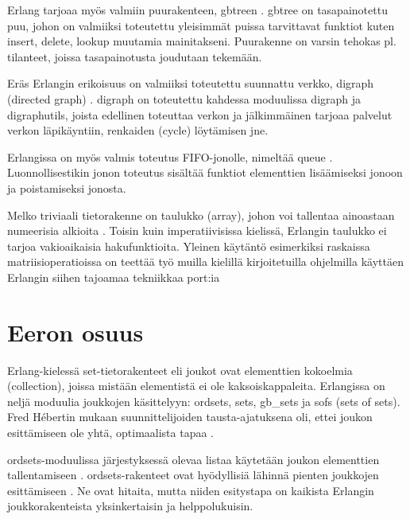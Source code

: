 \documentclass[11pt,oneside,a4paper]{article}
\begin{document}
 Erlang tarjoaa myös valmiin puurakenteen, gb\textunderscore treen \cite{HEB13}.
gb\textunderscore tree on tasapainotettu puu, johon on valmiiksi toteutettu
yleisimmät puissa tarvittavat funktiot kuten insert, delete, lookup muutamia
mainitakseni. Puurakenne on varsin tehokas pl. tilanteet, joissa tasapainotusta
joudutaan tekemään. 
 
 Eräs Erlangin erikoisuus on valmiiksi toteutettu suunnattu verkko, digraph
(directed graph) \cite{HEB13}. digraph on toteutettu kahdessa moduulissa digraph
ja digraph\textunderscore utils, joista edellinen toteuttaa verkon ja
jälkimmäinen tarjoaa palvelut verkon läpikäyntiin, renkaiden (cycle) löytämisen
jne. 
 
 Erlangissa on myös valmis toteutus FIFO-jonolle, nimeltää queue \cite{HEB13}.
Luonnollisestikin jonon toteutus sisältää funktiot elementtien lisäämiseksi
jonoon ja poistamiseksi jonosta. 
 
 Melko triviaali tietorakenne on taulukko (array), johon voi tallentaa
ainoastaan numeerisia alkioita \cite{HEB13}. Toisin kuin imperatiivisissa
kielissä, Erlangin taulukko ei tarjoa vakioaikaisia hakufunktioita. Yleinen
käytäntö esimerkiksi raskaissa matriisioperatioissa on teettää työ muilla
kielillä kirjoitetuilla ohjelmilla käyttäen Erlangin siihen tajoamaa tekniikkaa
port:ia
 

\section{Eeron osuus}

Erlang-kielessä set-tietorakenteet eli joukot ovat elementtien kokoelmia
(collection), joissa mistään elementistä ei ole kaksoiskappaleita. Erlangissa on
neljä moduulia joukkojen käsittelyyn: ordsets, sets, gb\_sets ja sofs (sets of
sets). Fred Hébertin mukaan suunnittelijoiden tausta-ajatuksena oli, ettei
joukon esittämiseen ole yhtä, optimaalista tapaa \cite{HEB13}.

ordsets-moduulissa järjestyksessä olevaa listaa käytetään joukon elementtien
tallentamiseen \cite{ERL13}. ordsets-rakenteet ovat hyödyllisiä lähinnä pienten
joukkojen esittämiseen \cite{HEB13}. Ne ovat hitaita, mutta niiden esitystapa
on kaikista Erlangin joukkorakenteista yksinkertaisin ja helppolukuisin. 


\end{document}
